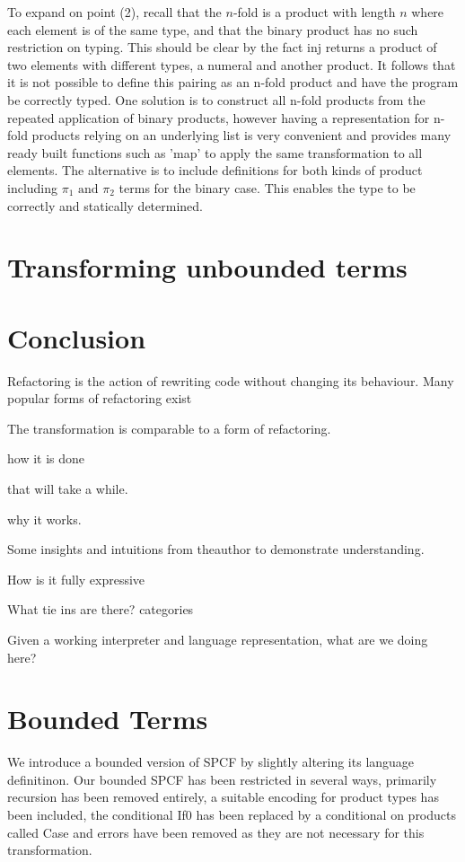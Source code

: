 \documentclass[12pt,a4paper]{report}
\theoremstyle{definition}
\theoremstyle{remark}
\begin{document}
To expand on point (2), recall that the $n$-fold is a product with length $n$ where each element is of the same type, and that the binary product has no such restriction on typing. This should be clear by the fact inj returns a product of two elements with different types, a numeral and another product. It follows that it is not possible to define this pairing as an n-fold product and have the program be correctly typed. One solution is to construct all n-fold products from the repeated application of binary products, however having a representation for n-fold products relying on an underlying list is very convenient and provides many ready built functions such as 'map' to apply the same transformation to all elements. The alternative is to include definitions for both kinds of product including $\pi_1 \text{ and } \pi_2$ terms for the binary case. This enables the type to be correctly and statically determined. 

\section{Transforming unbounded terms}

\section{Conclusion}


Refactoring is the action of rewriting code without changing its behaviour. Many popular forms of refactoring exist 

The transformation is comparable to a form of refactoring. 

how it is done 

that will take a while.

why it works.

Some insights and intuitions from theauthor to demonstrate understanding.

How is it fully expressive

What tie ins are there? categories

Given a working interpreter
and language representation, what are we doing here?

\section{Bounded Terms}
We introduce a bounded version of SPCF by slightly altering its language definitinon. Our bounded SPCF has been restricted in several ways, primarily recursion has been removed entirely, a suitable encoding for product types has been included, the conditional If0 has been replaced by a conditional on products called Case and errors have been removed as they are not necessary for this transformation.
\end{document}
